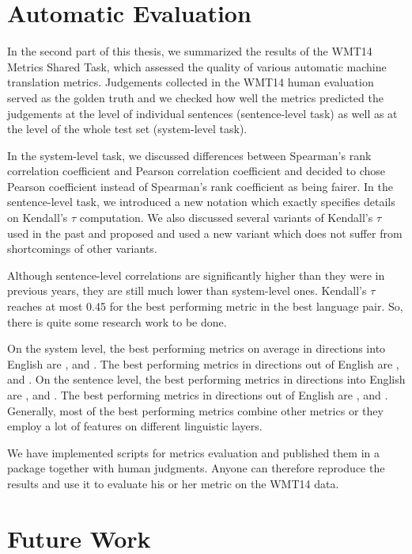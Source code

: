 \section{Automatic Evaluation}

In the second part of this thesis, we summarized the results of the WMT14
Metrics Shared Task, which assessed the quality of various automatic machine
translation metrics. Judgements collected in the WMT14 human evaluation served
as the golden truth and we checked how well the metrics predicted the
judgements at the level of individual sentences (sentence-level task) as well
as at the level of the whole test set (system-level task).

In the system-level task, we discussed differences between Spearman's rank
correlation coefficient and Pearson correlation coefficient and decided to
chose Pearson coefficient instead of Spearman's rank coefficient as being
fairer. In the sentence-level task, we introduced a new notation which exactly
specifies details on Kendall's $\tau$ computation. We also discussed several
variants of Kendall's $\tau$ used in the past and proposed and used a new
variant which does not suffer from shortcomings of other variants.

Although sentence-level correlations are significantly higher than they were in
previous years, they are still much lower than system-level ones. Kendall's
$\tau$ reaches at most 0.45 for the best performing metric in the best language
pair. So, there is quite some research work to be done.

On the system level, the best performing metrics on average in directions into
English are ,  and
. The best performing metrics in directions out of English
are ,  and . On the sentence level, the
best performing metrics in directions into English are
,  and . The best
performing metrics in directions out of English are ,
 and .  Generally, most of the best performing
metrics combine other metrics or they employ a lot of features on different
linguistic layers.

We have implemented scripts for metrics evaluation and published them in a
package together with human judgments. Anyone can therefore reproduce the
results and use it to evaluate his or her metric on the WMT14 data.

\section{Future Work}

